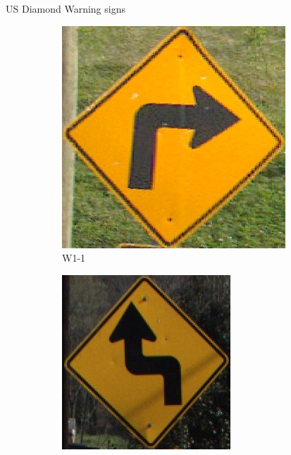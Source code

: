 \documentclass{beamer}
\begin{document}
\begin{frame}{US Diamond Warning signs}
    \begin{figure}
      \begin{center}
        \begin{subfigure}[t]{.3\linewidth}
          \centering
          \includegraphics[height=0.8\linewidth]{figures/W1-1_R.jpg}
          \caption{W1-1}
        \end{subfigure}
        \begin{subfigure}[t]{.3\linewidth}
          \centering
          \includegraphics[height=0.8\linewidth]{figures/W1-3_L.jpg}

\end{subfigure}
\end{center}
\end{figure}
\end{frame}
\end{document}
